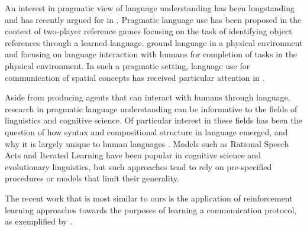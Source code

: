 \documentclass[letterpaper]{article} %
\begin{document}


An interest in pragmatic view of language understanding has been longstanding \cite{austin62,grice75} and has recently argued for in \cite{mordatch16,lake16,lazaridou16}. Pragmatic language use has been proposed in the context of two-player reference games \cite{klein10,vogel14,andreas16} focusing on the task of identifying object references through a learned language. \cite{winograd73,wang16} ground language in a physical environment and focusing on language interaction with humans for completion of tasks in the physical environment. In such a pragmatic setting, language use for communication of spatial concepts has received particular attention in \cite{steels95,spatial16}.

Aside from producing agents that can interact with humans through language, research in pragmatic language understanding can be informative to the fields of linguistics and cognitive science. Of particular interest in these fields has been the question of how syntax and compositional structure in language emerged, and why it is largely unique to human languages \cite{kirby_syntax99,nowak00syntax,steels05syntax}. Models such as Rational Speech Acts \cite{rsa12} and Iterated Learning \cite{kirby14iterated} have been popular in cognitive science and evolutionary linguistics, but such approaches tend to rely on pre-specified procedures or models that limit their generality.

The recent work that is most similar to ours is the application of reinforcement learning approaches towards the purposes of learning a communication protocol, as exemplified by \cite{bratman10,foerster16b,fergus16,lazaridou16b}.




\end{document}
